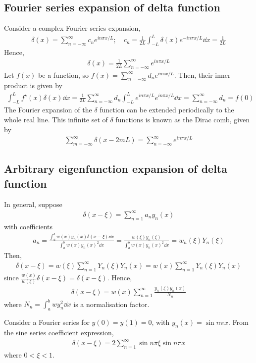 \subsection{Fourier series expansion of delta function}
Consider a complex Fourier series expansion,
\begin{align*}
	\delta(x) = \sum_{n=-\infty}^\infty c_n e^{in\pi x/L};\quad c_n = \frac{1}{2L}\int_{-L}^L \delta(x) e^{-i n \pi x / L} \dd{x} = \frac{1}{2L}
\end{align*}
Hence,
\begin{align*}
	\delta(x) = \frac{1}{2L} \sum_{n=-\infty}^\infty e^{in\pi x/L}
\end{align*}
Let $f(x)$ be a function, so $f(x) = \sum_{n=-\infty}^\infty d_n e^{in \pi x / L}$.
Then, their inner product is given by
\begin{align*}
	\int_{-L}^L f^\star(x) \delta(x) \dd{x} = \frac{1}{2L} \sum_{n = -\infty}^\infty d_n \int_{-L}^L e^{in \pi x/L} e^{in \pi x/L} \dd{x} = \sum_{n = -\infty}^\infty d_n = f(0)
\end{align*}
The Fourier expansion of the $\delta$ function can be extended periodically to the whole real line.
This infinite set of $\delta$ functions is known as the Dirac comb, given by
\begin{align*}
	\sum_{m = -\infty}^\infty \delta(x-2mL) = \sum_{n = -\infty}^\infty e^{in \pi x/L}
\end{align*}

\subsection{Arbitrary eigenfunction expansion of delta function}
In general, suppose
\begin{align*}
	\delta(x-\xi) = \sum_{n=1}^\infty a_n y_n(x)
\end{align*}
with coefficients
\begin{align*}
	a_n = \frac{\int_a^b w(x) y_n(x) \delta(x-\xi) \dd{x}}{\int_a^b w(x) y_n(x)^2 \dd{x}} = \frac{w(\xi) y_n(\xi)}{\int_a^b w(x) y_n(x)^2 \dd{x}} = w_n(\xi) Y_n(\xi)
\end{align*}
Then,
\begin{align*}
	\delta(x-\xi) = w(\xi) \sum_{n=1}^\infty Y_n(\xi) Y_n(x) = w(x) \sum_{n=1}^\infty Y_n(\xi) Y_n(x)
\end{align*}
since $\frac{w(x)}{w(\xi)} \delta(x - \xi) = \delta(x - \xi)$.
Hence,
\begin{align*}
	\delta(x-\xi) = w(x) \sum_{n=1}^\infty \frac{y_n(\xi) y_n(x)}{N_n}
\end{align*}
where $N_n = \int_a^b w y_n^2 \dd{x}$ is a normalisation factor.
\begin{example}
	Consider a Fourier series for $y(0) = y(1) = 0$, with $y_n(x) = \sin n \pi x$.
	From the sine series coefficient expression,
	\begin{align*}
		\delta(x-\xi) = 2\sum_{n=1}^\infty \sin n \pi \xi \sin n \pi x
	\end{align*}
	where $0 < \xi < 1$.
\end{example}

